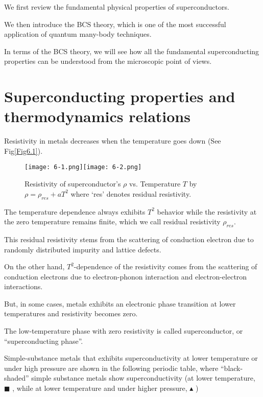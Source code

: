 ﻿\documentclass[twoside]{book}
\numberwithin{equation}{section}
\begin{document}
We first review the fundamental physical properties of superconductors.

We then introduce the BCS theory, which is one of the most successful application of quantum many-body techniques.

In terms of the BCS theory, we will see how all the fundamental superconducting properties can be understood from the microscopic point of views.



\section{Superconducting properties and thermodynamics relations}


Resistivity in metals decreases when the temperature goes down (See Fig{\ref{Fig6.1}}).

\begin{figure}
\begin{center}
\texttt{[image: 6-1.png]}\label{Fig6.1}\texttt{[image: 6-2.png]}\label{Fig6.2}
\caption{Resistivity $\rho$ vs. Temperature $T$ by $\rho = \rho_{res} + aT^2$ where `res' denotes residual resistivity. } \caption{Resistivity of superconductor's $\rho$ vs. Temperature $T$ by $\rho = \rho_{res} + aT^2$ where `res' denotes residual resistivity. } 
\end{center}
\end{figure}
The temperature dependence always exhibits $T^2$ behavior while the resistivity at the zero temperature remains finite, which we call residual resistivity $\rho_{res}$.
    
This residual resistivity stems from the scattering of conduction electron due to randomly distributed impurity and lattice defects. 
    
On the other hand, $T^2$-dependence of the resistivity comes from the scattering of conduction electrons due to electron-phonon interaction and electron-electron interactions. 
    
But, in some cases, metals exhibits an electronic phase transition at lower temperatures and resistivity becomes zero. 

The low-temperature phase with zero resistivity is called superconductor, or ``superconducting phase''. 

Simple-substance metals that exhibits superconductivity at lower temperature or under high pressure are shown in the following periodic table, where ``black-shaded'' simple substance metals show superconductivity (at lower temperature, $\blacksquare$ , while at lower temperature and under higher pressure, $\blacktriangle$ )
\end{document}
